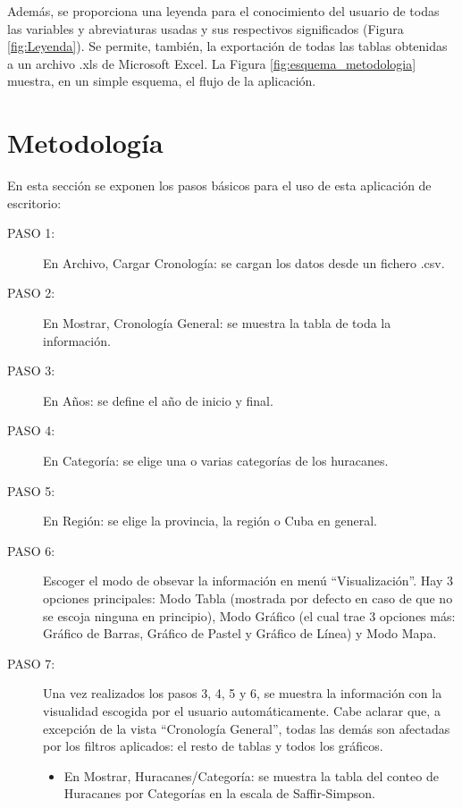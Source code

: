 Además, se proporciona una leyenda para el conocimiento del usuario de todas las variables y abreviaturas usadas y sus respectivos significados (Figura \ref{fig:Leyenda}). Se permite, también, la exportación de todas las tablas obtenidas a un archivo .xls de Microsoft Excel. La Figura \ref{fig:esquema_metodologia} muestra, en un simple esquema, el flujo de la aplicación.\\

\section{Metodología}

En esta sección se exponen los pasos básicos para el uso de esta aplicación de escritorio:
\begin{description}

\item[PASO 1:]{ En Archivo, Cargar Cronología: se cargan los datos desde un fichero .csv.}

\item[PASO 2:]{ En Mostrar, Cronología General: se muestra la tabla de toda la información.}

\item[PASO 3:]{ En Años: se define el año de inicio y final.} 

\item[PASO 4:]{ En Categoría: se elige una o varias categorías de los huracanes.}

\item[PASO 5:]{ En Región: se elige la provincia, la región o Cuba en general.}

\item[PASO 6:]{ Escoger el modo de obsevar la información en menú “Visualización”. Hay 3 opciones principales: Modo Tabla (mostrada por defecto en caso de que no se escoja ninguna en principio), Modo Gráfico (el cual trae 3 opciones más: Gráfico de Barras, Gráfico de Pastel y Gráfico de Línea) y Modo Mapa.}

\item[PASO 7:]{ Una vez realizados los pasos 3, 4, 5 y 6, se muestra la información con la visualidad escogida por el usuario automáticamente. Cabe aclarar que, a excepción de la vista ``Cronología General'', todas las demás son afectadas por los filtros aplicados: el resto de tablas y todos los gráficos.}


\begin{itemize}

\item En Mostrar, Huracanes/Categoría: se muestra la tabla del conteo de Huracanes por Categorías en la escala de Saffir-Simpson.


\end{itemize}
\end{description}
